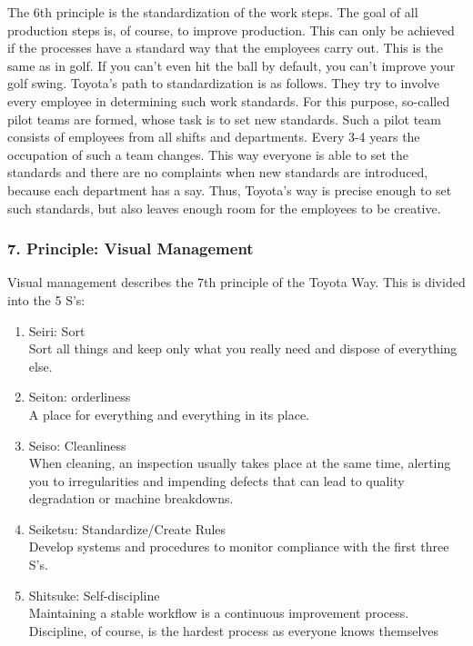 \documentclass[a4paper,12pt]{scrartcl}
\begin{document}
The 6th principle is the standardization of the work steps. The goal of all production steps is, of course, to improve production. This can only be achieved if the processes have a standard way that the employees carry out. This is the same as in golf. If you can't even hit the ball by default, you can't improve your golf swing. 
Toyota's path to standardization is as follows. They try to involve every employee in determining such work standards. For this purpose, so-called pilot teams are formed, whose task is to set new standards. Such a pilot team consists of employees from all shifts and departments. Every 3-4 years the occupation of such a team changes. This way everyone is able to set the standards and there are no complaints when new standards are introduced, because each department has a say. Thus, Toyota's way is precise enough to set such standards, but also leaves enough room for the employees to be creative.

\subsubsection{7. Principle: Visual Management}

Visual management describes the 7th principle of the Toyota Way. This is divided into the 5 S's:

\begin{enumerate}
    \item Seiri: Sort\\
    Sort all things and keep only what you really need and dispose of everything else.
    \item Seiton: orderliness \\
    A place for everything and everything in its place.
    \item Seiso: Cleanliness\\
    When cleaning, an inspection usually takes place at the same time, alerting you to irregularities and impending defects that can lead to quality degradation or machine breakdowns.
    \item Seiketsu: Standardize/Create Rules \\
    Develop systems and procedures to monitor compliance with the first three S's.
    \item Shitsuke: Self-discipline \\
    Maintaining a stable workflow is a continuous improvement process. Discipline, of course, is the hardest process as everyone knows themselves
\end{enumerate}
\end{document}
